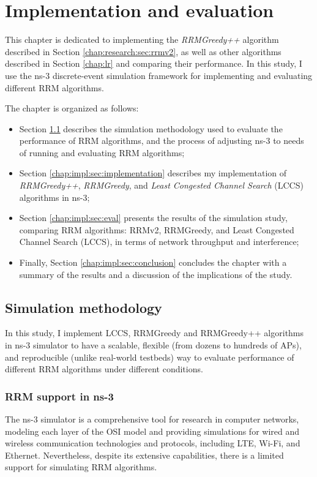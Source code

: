 \chapter{Implementation and evaluation}
\label{chap:impl}


This chapter is dedicated to implementing the \textit{RRMGreedy++} algorithm described in Section \ref{chap:research:sec:rrmv2}, as well as other algorithms described in Section \ref{chap:lr} and comparing their performance. In this study, I use the ns-3 discrete-event simulation framework for implementing and evaluating different RRM algorithms.

The chapter is organized as follows:
\begin{itemize}
    \item Section \ref{chap:impl:sec:simulation_method} describes the simulation methodology used to evaluate the performance of RRM algorithms, and the process of adjusting ns-3 to needs of running and evaluating RRM algorithms;
    \item Section \ref{chap:impl:sec:implementation} describes my implementation of \textit{RRMGreedy++}, \textit{RRMGreedy}, and \textit{Least Congested Channel Search} (LCCS) algorithms in ns-3;
    \item Section \ref{chap:impl:sec:eval} presents the results of the simulation study, comparing RRM algorithms: RRMv2, RRMGreedy, and Least Congested Channel Search (LCCS), in terms of network throughput and interference;
    \item Finally, Section \ref{chap:impl:sec:conclusion} concludes the chapter with a summary of the results and a discussion of the implications of the study.

\end{itemize}

\section{Simulation methodology}
\label{chap:impl:sec:simulation_method}
In this study, I implement LCCS, RRMGreedy and RRMGreedy++ algorithms in ns-3 simulator to have a scalable, flexible (from dozens to hundreds of APs), and reproducible (unlike real-world testbeds) way to evaluate performance of different RRM algorithms under different conditions.

\subsection{RRM support in ns-3}
The ns-3 simulator is a comprehensive tool for research in computer networks, modeling each layer of the OSI model and providing simulations for wired and wireless communication technologies and protocols, including LTE, Wi-Fi, and Ethernet. Nevertheless, despite its extensive capabilities, there is a limited support for simulating RRM algorithms.

